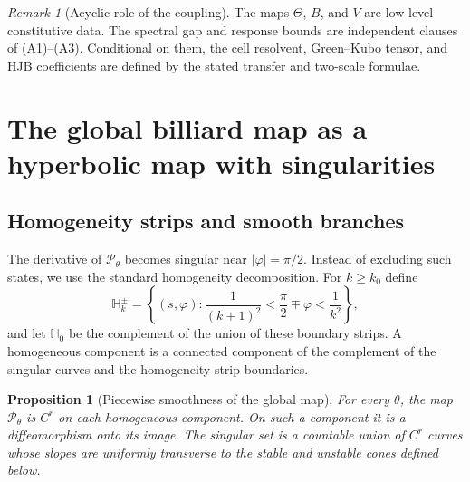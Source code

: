 \documentclass[12pt, letterpaper]{amsart}
\newcommand{\Pcal}{\mathcal{P}}
\theoremstyle{plain}
\newtheorem{proposition}[theorem]{Proposition}
\theoremstyle{definition}
\theoremstyle{remark}
\newtheorem{remark}[theorem]{Remark}
\begin{document}
\begin{remark}[Acyclic role of the coupling]
The maps $\Theta$, $B$, and $V$ are low-level constitutive data. The spectral
gap and response bounds are independent clauses of \textup{(A1)--(A3)}.
Conditional on them, the cell resolvent, Green--Kubo tensor, and HJB
coefficients are defined by the stated transfer and two-scale formulae.
\end{remark}

\section{The global billiard map as a hyperbolic map with singularities}
\label{sec:singular_hyperbolicity}

\subsection{Homogeneity strips and smooth branches}

The derivative of $\Pcal_\theta$ becomes singular near $|\varphi|=\pi/2$.  Instead of excluding such states, we use the standard homogeneity decomposition.  For $k\ge k_0$ define
\begin{equation}
    \mathbb H_{k}^{\pm}
    =\left\{(s,\varphi):\frac{1}{(k+1)^2}<\frac{\pi}{2}\mp\varphi<\frac{1}{k^2}\right\},
\end{equation}
and let $\mathbb H_0$ be the complement of the union of these boundary strips.  A homogeneous component is a connected component of the complement of the singular curves and the homogeneity strip boundaries.

\begin{proposition}[Piecewise smoothness of the global map]
\label{prop:piecewise_smoothness}
For every $\theta$, the map $\Pcal_\theta$ is $C^r$ on each homogeneous component.  On such a component it is a diffeomorphism onto its image.  The singular set is a countable union of $C^r$ curves whose slopes are uniformly transverse to the stable and unstable cones defined below.
\end{proposition}
\end{document}
